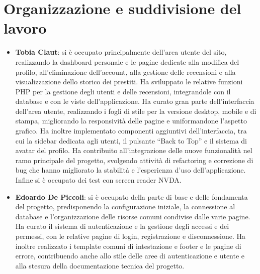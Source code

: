 ﻿\documentclass{article}
\begin{document}
\section{Organizzazione e suddivisione del lavoro}
\begin{itemize}
    \item \textbf{Tobia Claut}: si è occupato principalmente dell'area utente del sito, realizzando la dashboard personale e le pagine dedicate alla modifica del profilo, all'eliminazione dell'account, alla gestione delle recensioni e alla visualizzazione dello storico dei prestiti. Ha sviluppato le relative funzioni PHP per la gestione degli utenti e delle recensioni, integrandole con il database e con le viste dell'applicazione. Ha curato gran parte dell'interfaccia dell'area utente, realizzando i fogli di stile per la versione desktop, mobile e di stampa, migliorando la responsività delle pagine e uniformandone l'aspetto grafico. Ha inoltre implementato componenti aggiuntivi dell'interfaccia, tra cui la sidebar dedicata agli utenti, il pulsante ``Back to Top'' e il sistema di avatar del profilo. Ha contribuito all'integrazione delle nuove funzionalità nel ramo principale del progetto, svolgendo attività di refactoring e correzione di bug che hanno migliorato la stabilità e l'esperienza d'uso dell'applicazione. Infine si è occupato dei test con screen reader NVDA.
    \item \textbf{Edoardo De Piccoli}: si è occupato della parte di base e delle fondamenta del progetto, predisponendo la configurazione iniziale, la connessione al database e l'organizzazione delle risorse comuni condivise dalle varie pagine. Ha curato il sistema di autenticazione e la gestione degli accessi e dei permessi, con le relative pagine di login, registrazione e disconnessione. Ha inoltre realizzato i template comuni di intestazione e footer e le pagine di errore, contribuendo anche allo stile delle aree di autenticazione e utente e alla stesura della documentazione tecnica del progetto.

\end{itemize}
\end{document}
